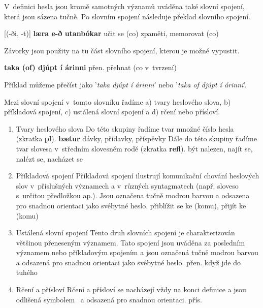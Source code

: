 V~definici hesla jsou kromě samotných významů uváděna také slovní spojení, která jsou sázena tučně. Po slovním spojení následuje překlad slovního spojení.

\blspace
  \dicEntry {} [(-ði, -t)] \textbf{læra e-ð utanbókar} {učit se (co) zpaměti, memorovat (co)}
\blspace

Závorky jsou použity na tu část slovního spojení, kterou je možné vypustit.

\blspace
  \dicEntry {}   \textbf{taka (of) djúpt í árinni} {\footnotesize{přen.}} {přehnat (co v~tvrzení)}
\blspace

Příklad můžeme přečíst jako '\textit{taka djúpt í árinni}' nebo '\textit{taka of djúpt í árinni}'.

Mezi slovní spojení v~tomto slovníku řadíme a) tvary heslového slova, b) příkladová spojení, c) ustálená slovní spojení a d) rčení nebo přísloví.

\begin{enumerate}
\item Tvary heslového slova
Do této skupiny řadíme tvar množné číslo hesla (zkratka \textbf{pl}).
\blspace
\dicEntry {}   \textbf{bætur}  {dávky, přídavky, příspěvky}
Dále do této skupiny řadíme tvar slovesa v~středním slovesném rodě (zkratka \textbf{refl}).
\dicEntry {}     {být nalezen, najít se, nalézt se, nacházet se}
\blspace
\item Příkladová spojení
Příkladová spojení ilustrují komunikační chování heslových slov v~příslušných významech a v~různých syntagmatech (např. sloveso s~určitou předložkou ap.). Jsou označena tučně modrou barvou a odsazena pro snadnou orientaci jako svébytné heslo.
\blspace
\dicEntry {}    {přiblížit se ke (komu), přijít ke (komu)}
\blspace
\item Ustálená slovní spojení
Tento druh slovních spojení je charakterizován většinou přeneseným významem. Tato spojení jsou uváděna za posledním významem nebo příkladovým spojením a jsou označená tučně modrou barvou a odsazená pro snadnou orientaci jako svébytné heslo.
\blspace
\dicEntry {}    {\footnotesize{přen.}} {když jde do tuhého}
\blspace
\item Rčení a přísloví
Rčení a přísloví se nacházejí vždy na konci definice a jsou odlišená symbolem \dicsymProverb\ a odsazená pro snadnou orientaci.
\blspace
\dicEntry {}    {\footnotesize{přís.}} 
\end{enumerate}

